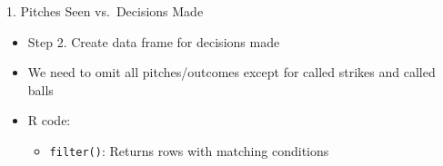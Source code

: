 \begin{frame}[fragile]{1. Pitches Seen vs.~Decisions Made}

\begin{itemize}
\tightlist
\item
  Step 2. Create data frame for decisions made
\item
  We need to omit all pitches/outcomes except for called strikes and
  called balls
\item
  R code:

  \begin{itemize}
  \tightlist
  \item
    \texttt{filter()}: Returns rows with matching conditions
  \end{itemize}
\end{itemize}

\footnotesize

\begin{Shaded}
\end{Shaded}

\end{frame}

